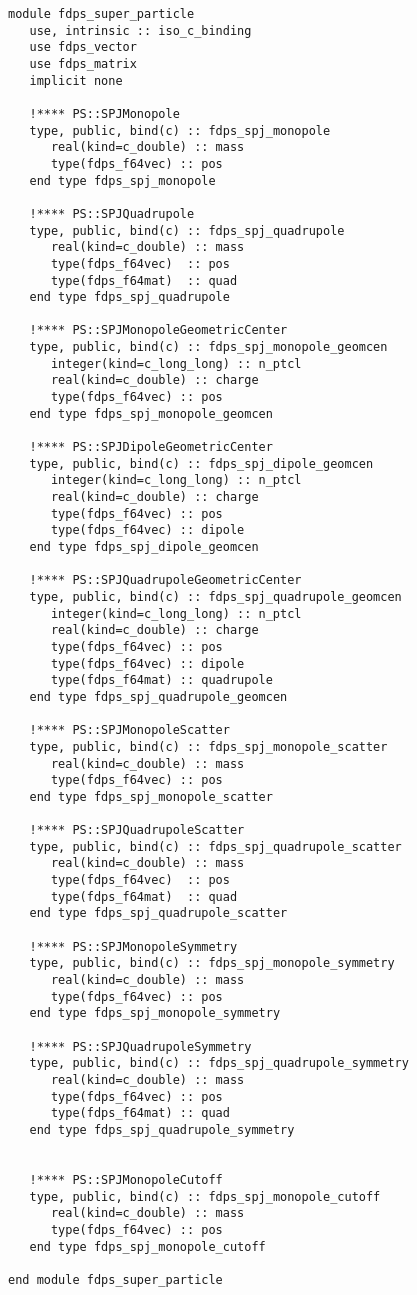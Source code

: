 \begin{lstlisting}[caption=超粒子型 (Fortran)]
module fdps_super_particle
   use, intrinsic :: iso_c_binding
   use fdps_vector
   use fdps_matrix
   implicit none

   !**** PS::SPJMonopole
   type, public, bind(c) :: fdps_spj_monopole
      real(kind=c_double) :: mass
      type(fdps_f64vec) :: pos
   end type fdps_spj_monopole

   !**** PS::SPJQuadrupole
   type, public, bind(c) :: fdps_spj_quadrupole
      real(kind=c_double) :: mass
      type(fdps_f64vec)  :: pos
      type(fdps_f64mat)  :: quad
   end type fdps_spj_quadrupole

   !**** PS::SPJMonopoleGeometricCenter
   type, public, bind(c) :: fdps_spj_monopole_geomcen
      integer(kind=c_long_long) :: n_ptcl
      real(kind=c_double) :: charge
      type(fdps_f64vec) :: pos
   end type fdps_spj_monopole_geomcen

   !**** PS::SPJDipoleGeometricCenter
   type, public, bind(c) :: fdps_spj_dipole_geomcen
      integer(kind=c_long_long) :: n_ptcl
      real(kind=c_double) :: charge
      type(fdps_f64vec) :: pos
      type(fdps_f64vec) :: dipole
   end type fdps_spj_dipole_geomcen

   !**** PS::SPJQuadrupoleGeometricCenter
   type, public, bind(c) :: fdps_spj_quadrupole_geomcen
      integer(kind=c_long_long) :: n_ptcl
      real(kind=c_double) :: charge
      type(fdps_f64vec) :: pos
      type(fdps_f64vec) :: dipole
      type(fdps_f64mat) :: quadrupole
   end type fdps_spj_quadrupole_geomcen

   !**** PS::SPJMonopoleScatter
   type, public, bind(c) :: fdps_spj_monopole_scatter
      real(kind=c_double) :: mass
      type(fdps_f64vec) :: pos
   end type fdps_spj_monopole_scatter

   !**** PS::SPJQuadrupoleScatter
   type, public, bind(c) :: fdps_spj_quadrupole_scatter
      real(kind=c_double) :: mass
      type(fdps_f64vec)  :: pos
      type(fdps_f64mat)  :: quad
   end type fdps_spj_quadrupole_scatter
   
   !**** PS::SPJMonopoleSymmetry
   type, public, bind(c) :: fdps_spj_monopole_symmetry
      real(kind=c_double) :: mass
      type(fdps_f64vec) :: pos
   end type fdps_spj_monopole_symmetry

   !**** PS::SPJQuadrupoleSymmetry
   type, public, bind(c) :: fdps_spj_quadrupole_symmetry
      real(kind=c_double) :: mass
      type(fdps_f64vec) :: pos
      type(fdps_f64mat) :: quad
   end type fdps_spj_quadrupole_symmetry


   !**** PS::SPJMonopoleCutoff
   type, public, bind(c) :: fdps_spj_monopole_cutoff
      real(kind=c_double) :: mass
      type(fdps_f64vec) :: pos
   end type fdps_spj_monopole_cutoff

end module fdps_super_particle   

\end{lstlisting}

